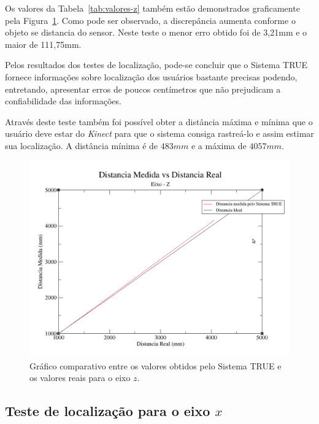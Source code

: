 	Os valores da Tabela~\ref{tab:valores-z} também estão demonstrados graficamente
	pela Figura~\ref{fig:grafico-z}. Como pode ser observado, a discrepância
	aumenta conforme o objeto se distancia do sensor. Neste teste o menor erro
	obtido foi de 3,21mm e o maior de 111,75mm.
	
	Pelos resultados dos testes de localização, pode-se concluir que o
	Sistema TRUE fornece informações sobre localização dos usuários bastante
	precisas podendo, entretando, apresentar erros de poucos centímetros que não
	prejudicam a confiabilidade das informações.

	Através deste teste também foi possível obter a distância máxima e mínima que o
	usuário deve estar do \textit{Kinect} para que o sistema consiga rastreá-lo e
	assim estimar sua localização. A distância mínima é de $\displaystyle 483mm$
	e a máxima de $\displaystyle 4057mm$.

	\begin{figure}[H]
		\begin{center}
			\includegraphics[scale=0.4]{figuras/5.Testes/grafico-eixo-z.png}
		\end{center}
		\caption{Gráfico comparativo entre os valores obtidos pelo Sistema TRUE e os
		valores reais para o eixo $\displaystyle z$.}
		\label{fig:grafico-z}
	\end{figure}

\subsection{Teste de localização para o eixo $\displaystyle x$}

